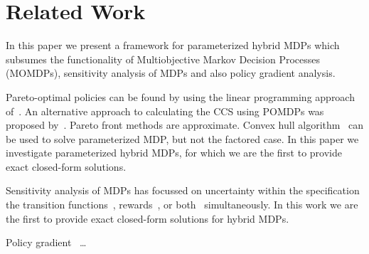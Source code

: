 \section{Related Work}
\label{sec:background}

In this paper we present a framework for parameterized hybrid MDPs which subsumes the functionality of Multiobjective Markov Decision Processes (MOMDPs), sensitivity analysis of MDPs and also policy gradient analysis.


Pareto-optimal policies can be found by using the linear programming approach of~\parencite{Viswanathan_TIMS_1977}. An alternative approach to calculating the CCS using POMDPs was proposed by~\parencite{White_LSS_1980}. Pareto front methods are approximate. Convex hull algorithm~\parencite{Barrett_ICML_2008} can be used to solve parameterized MDP, but not the factored case. In this paper we investigate parameterized hybrid MDPs, for which we are the first to provide exact closed-form solutions.

Sensitivity analysis of MDPs has focussed on uncertainty within the specification the transition functions~\parencite{Kalyanasundaram_AJC_2004}, rewards~\parencite{Tan_JAP_2011, Hopp_JOTA_1988}, or both~\parencite{Givan_AI_2000} simultaneously. In this work we are the first to provide exact closed-form solutions for hybrid MDPs.

Policy gradient~\parencite{Sutton_NIPS_1999} \ldots


